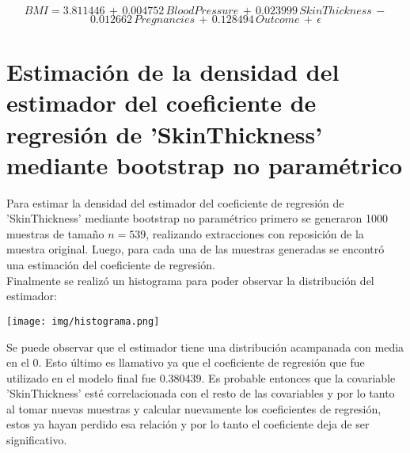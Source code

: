 \documentclass{article}
\begin{document}
$$BMI = 3.811446 \, + \, 0.004752 \, BloodPressure \, + \, 0.023999 \, SkinThickness \,
- $$
$$0.012662 \, Pregnancies \, + \, 0.128494 \, Outcome \, + \, \epsilon $$


\section{Estimación de la densidad del estimador del coeficiente de regresión de 'SkinThickness' mediante bootstrap no paramétrico}

\noindent
Para estimar la densidad del estimador del coeficiente de regresión de 'SkinThickness' mediante bootstrap no paramétrico primero se generaron 1000 muestras de tamaño $n=539$, realizando extracciones con reposición de la muestra original. Luego, para cada una de las muestras generadas se encontró una estimación del coeficiente de regresión.\\

\noindent
Finalmente se realizó un histograma para poder observar la distribución del estimador:\\

\begin{center}
    \texttt{[image: img/histograma.png]}
\end{center}

\noindent
Se puede observar que el estimador tiene una distribución acampanada con media en el 0. Esto último es llamativo ya que el coeficiente de regresión que fue utilizado en el modelo final fue 0.380439. Es probable entonces que la covariable 'SkinThickness' esté correlacionada con el resto de las covariables y por lo tanto al tomar nuevas muestras y calcular nuevamente los coeficientes de regresión, estos ya hayan perdido esa relación y por lo tanto el coeficiente deja de ser significativo.
\end{document}
